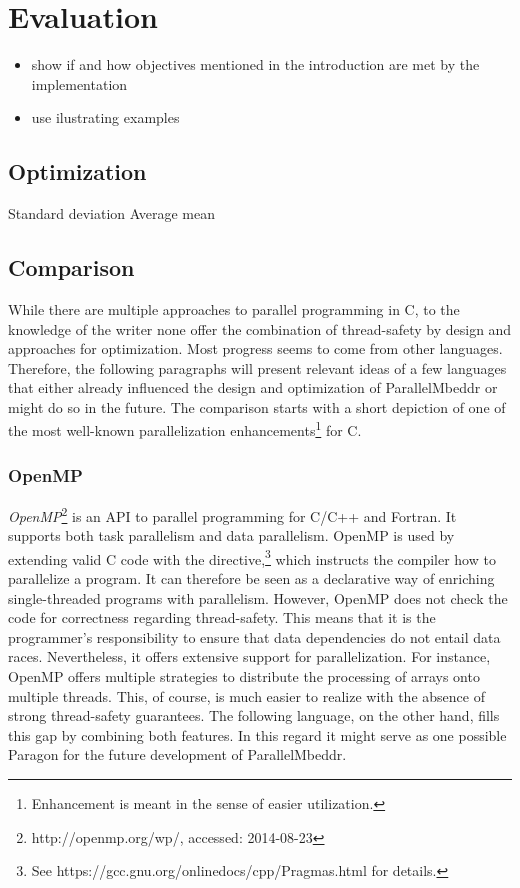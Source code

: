 \chapter{Evaluation}
\label{evaluation}

\begin{itemize}
\item show if and how objectives mentioned in the introduction are met by the implementation
\item use ilustrating examples
\end{itemize}

\section{Optimization}
Standard deviation
Average mean

\section{Comparison}
While there are multiple approaches to parallel programming in C, to the knowledge of the writer none offer the combination of thread-safety by design and approaches for optimization. Most progress seems to come from other languages. Therefore, the following paragraphs will present relevant ideas of a few languages that either already influenced the design and optimization of ParallelMbeddr or might do so in the future. The comparison starts with a short depiction of one of the most well-known parallelization enhancements\footnote{Enhancement is meant in the sense of easier utilization.} for C.

\subsection{OpenMP}
\textit{OpenMP}\footnote{http://openmp.org/wp/, accessed: 2014-08-23} is an API to parallel programming for C/C++ and Fortran\cite[p.~1]{OpenMP}. It supports both task parallelism and data parallelism. OpenMP is used by extending valid C code with the  directive,\footnote{See https://gcc.gnu.org/onlinedocs/cpp/Pragmas.html for details.} which instructs the compiler how to parallelize a program. It can therefore be seen as a declarative way of enriching single-threaded programs with parallelism. However, OpenMP does not check the code for correctness regarding thread-safety. This means that it is the programmer's responsibility to ensure that data dependencies do not entail data races. Nevertheless, it offers extensive support for parallelization. For instance, OpenMP offers multiple strategies to distribute the processing of arrays onto multiple threads. This, of course, is much easier to realize with the absence of strong thread-safety guarantees. The following language, on the other hand, fills this gap by combining both features. In this regard it might serve as one possible Paragon for the future development of ParallelMbeddr.

